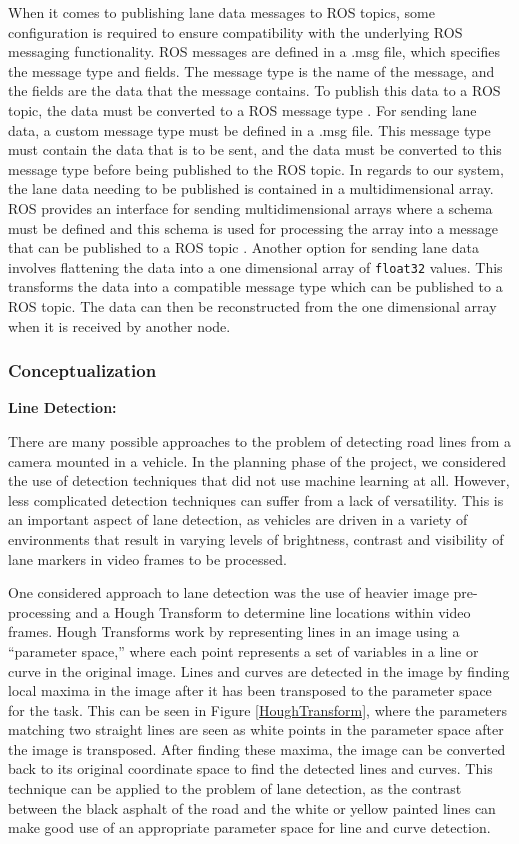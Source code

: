 \documentclass[titlepage, draft]{article}
\begin{document}
When it comes to publishing lane data messages to ROS topics, some configuration is required to ensure compatibility with the underlying ROS messaging functionality. ROS messages are defined in a .msg file, which specifies the message type and fields. The message type is the name of the message, and the fields are the data that the message contains. To publish this data to a ROS topic, the data must be converted to a ROS message type \cite{ros_documentation}. For sending lane data, a custom message type must be defined in a .msg file. This message type must contain the data that is to be sent, and the data must be converted to this message type before being published to the ROS topic. In regards to our system, the lane data needing to be published is contained in a multidimensional array. ROS provides an interface for sending multidimensional arrays where a schema must be defined and this schema is used for processing the array into a message that can be published to a ROS topic \cite{ros_multi_array}. Another option for sending lane data involves flattening the data into a one dimensional array of \texttt{float32} values. This transforms the data into a compatible message type which can be published to a ROS topic. The data can then be reconstructed from the one dimensional array when it is received by another node.


\subsubsection{Conceptualization}
\label{DetConcept}

\textbf{Line Detection:}

There are many possible approaches to the problem of detecting road lines from a camera mounted in a vehicle.
In the planning phase of the project, we considered the use of detection techniques that did not use machine learning at all.
However, less complicated detection techniques can suffer from a lack of versatility.
This is an important aspect of lane detection, as vehicles are driven in a variety of environments that result in varying
levels of brightness, contrast and visibility of lane markers in video frames to be processed.

One considered approach to lane detection was the use of heavier image pre-processing and a Hough Transform to determine line
locations within video frames.
Hough Transforms work by representing lines in an image using a ``parameter space,'' where each point represents a set of
variables in a line or curve in the original image.
Lines and curves are detected in the image by finding local maxima in the image after it has been transposed to the parameter space
for the task.
This can be seen in Figure \ref{HoughTransform}, where the parameters matching two straight lines are seen as white points in
the parameter space after the image is transposed.
After finding these maxima, the image can be converted back to its original coordinate space to find the detected lines and
curves.
This technique can be applied to the problem of lane detection, as the contrast between the black asphalt of the road and the
white or yellow painted lines can make good use of an appropriate parameter space for line and curve detection.
\end{document}
